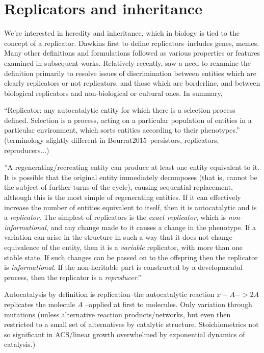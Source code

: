 \section{Replicators and inheritance}

We're interested in heredity and inheritance, which in biology is tied to the concept of a replicator. Dawkins first to define replicators--includes genes, memes. Many other definitions and formulations followed as various properties or features examined in subsequent works. Relatively recently, \cite{Zachar2010} saw a need to rexamine the definition primarily to resolve issues of discrimination between entities which are clearly replicators or not replicators, and those which are borderline, and between biological replicators and non-biological or cultural ones. In summary,

``Replicator: any autocatalytic entity for which there is a selection process defined. Selection is a process, acting on a particular population of entities in a particular environment, which sorts entities according to their phenotypes.'' \parencite[p.21]{Zachar2010} (terminology slightly different in Bourrat2015--persistors, replicators, reproducers...)

''A regenerating/recreating entity can produce at least one entity equivalent to it. It is possible that the original entity immediately decomposes (that is, cannot be the subject of further turns of the cycle), causing sequential replacement, although this is the most simple of regenerating entities. If it can effectively increase the number of entities equivalent to itself, then it is autocatalytic and is a \emph{replicator}. The simplest of replicators is the \emph{exact replicator}, which is \emph{non-informational}, and any change made to it causes a change in the phenotype. If a variation can arise in the structure in such a way that it does not change equivalence of the entity, then it is a \emph{variable} replicator, with more than one stable state. If such changes can be passed on to the offspring then the replicator is \emph{informational}. If the non-heritable part is constructed by a developmental process, then the replicator is a \emph{reproducer}.'' \parencite[p.21]{Zachar2010}

Autocatalysis by definition is replication--the autocatalytic reaction $x+A->2A$ replicates the molecule $A$ \cite{Lifson1997}--applied at first to molecules. Only variation through mutations (unless alternative reaction products/networks, but even then restricted to a small set of alternatives by catalytic structure. Stoichiometrics not so significant in ACS/linear growth overwhelmed by exponential dynamics of catalysis.)

